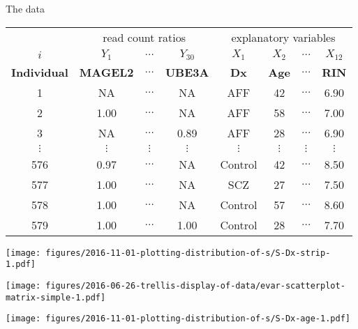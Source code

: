 \documentclass[usenames,dvipsnames]{beamer} %
\begin{document}
\begin{frame}{The data}
\footnotesize
\begin{tabular}{|c|ccc|cccc|}
 & \multicolumn{3}{|c|}{read count ratios} & \multicolumn{4}{|c|}{explanatory variables} \\
\(i\) & \(Y_1\) & \(\hdots\) & \(Y_{30}\) & \(X_1\) & \(X_2\) & \(\hdots\) & \(X_{12}\) \\
\textbf{Individual} & \textbf{MAGEL2} & \(\hdots\) & \textbf{UBE3A} & \textbf{Dx} & \textbf{Age} & \(\hdots\) & \textbf{RIN} \\
\hline
1 & NA & \(\hdots\) & NA & AFF & 42 & \(\hdots\) & 6.90 \\
2 & 1.00 & \(\hdots\) & NA & AFF & 58 & \(\hdots\) & 7.00 \\
3 & NA & \(\hdots\) & 0.89 & AFF & 28 & \(\hdots\) & 6.90 \\
\(\vdots\) & \(\vdots\) & \(\vdots\) & \(\vdots\) & \(\vdots\) & \(\vdots\) & \(\vdots\) & \(\vdots\) \\
576 & 0.97 & \(\hdots\) & NA & Control & 42 & \(\hdots\) & 8.50 \\
577 & 1.00 & \(\hdots\) & NA & SCZ & 27 & \(\hdots\) & 7.50 \\
578 & 1.00 & \(\hdots\) & NA & Control & 57 & \(\hdots\) & 8.60 \\
579 & 1.00 & \(\hdots\) & 1.00 & Control & 28 & \(\hdots\) & 7.70 \\
\end{tabular}
\end{frame}

\begin{frame}%
\begin{center}
\texttt{[image: figures/2016-11-01-plotting-distribution-of-s/S-Dx-strip-1.pdf]}
\end{center}
\end{frame}

\begin{frame}%
\begin{center}
\texttt{[image: figures/2016-06-26-trellis-display-of-data/evar-scatterplot-matrix-simple-1.pdf]}
\end{center}
\end{frame}

\begin{frame}[label=S-Age]
\begin{center}
\texttt{[image: figures/2016-11-01-plotting-distribution-of-s/S-Dx-age-1.pdf]}
\end{center}
\end{frame}
\end{document}
